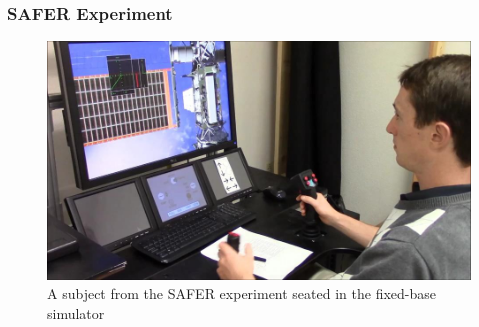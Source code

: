 \documentclass[float=false, crop=false]{standalone}
\begin{document}
\subsubsection{SAFER Experiment}
\begin{figure}[tb]
    \begin{center}
        \includegraphics[width=0.8\linewidth]{./../img/SAFER_DangerChris.jpg}
        \caption{A subject from the SAFER experiment seated in the fixed-base simulator~\cite{Karasinski2016Masters}}
        \label{figure:safersim}
    \end{center}
\end{figure}
\end{document}
